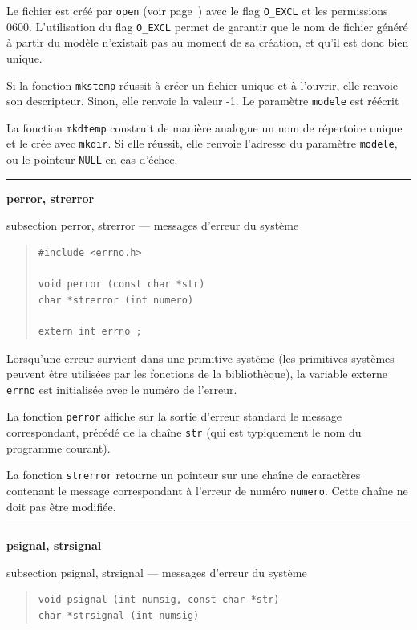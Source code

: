 \documentclass [twoside] {report}
\newcommand {\primitive} [1]
    {
	\phantomsection
	{\large \textbf {#1}}
	\addcontentsline {toc} {subsection} {#1}
    }
\newcommand {\separation}
    {
	\vspace {5mm}
	\nopagebreak
	\hrule
    }
\begin{document}
Le fichier est créé par \texttt {open} (voir page~\pageref {open})
avec le flag \texttt{O\_EXCL} et les permissions 0600. L'utilisation du
flag \texttt{O\_EXCL} permet de garantir que le nom de fichier généré
à partir du modèle n'existait pas au moment de sa création, et qu'il
est donc bien unique.

Si la fonction \texttt {mkstemp} réussit à créer un fichier unique
et à l'ouvrir, elle renvoie son descripteur. Sinon, elle renvoie la
valeur -1. Le paramètre \texttt{modele} est réécrit 

La fonction \texttt {mkdtemp} construit de manière analogue un nom de
répertoire unique et le crée avec \texttt {mkdir}. Si elle réussit,
elle renvoie l'adresse du paramètre \texttt{modele}, ou le pointeur
\texttt {NULL} en cas d'échec.


\separation 
\primitive {perror, strerror} --- messages d'erreur du système

\begin {quote}
\begin {verbatim}
#include <errno.h>

void perror (const char *str)
char *strerror (int numero)

extern int errno ;
\end{verbatim}
\end {quote}

Lorsqu'une erreur survient dans une primitive système (les
primitives systèmes peuvent être utilisées par les fonctions de la
bibliothèque), la variable externe \texttt {errno} est initialisée avec
le numéro de l'erreur.

La fonction \texttt {perror} affiche sur la sortie d'erreur standard le
message correspondant, précédé de la chaîne \texttt {str} (qui est
typiquement le nom du programme courant).

La fonction \texttt {strerror} retourne un pointeur sur une chaîne de
caractères contenant le message correspondant à l'erreur de numéro
\texttt {numero}. Cette chaîne ne doit pas être modifiée.



\separation 
\primitive {psignal, strsignal} --- messages d'erreur du système

\begin {quote}
\begin {verbatim}
void psignal (int numsig, const char *str)
char *strsignal (int numsig)
\end{verbatim}
\end {quote}
\end{document}

